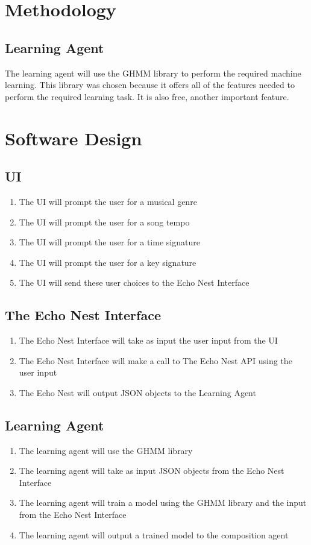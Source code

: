 \documentclass{article}
\begin{document}
\section{Methodology}
\subsection{Learning Agent}
The learning agent will use the GHMM library \cite{GHMM} to perform the required machine learning.
This library was chosen because it offers all of the features needed to perform the required 
learning task. It is also free, another important feature.

\section{Software Design}
\subsection{UI}
\begin{enumerate}
\item The UI will prompt the user for a musical genre
\item The UI will prompt the user for a song tempo
\item The UI will prompt the user for a time signature
\item The UI will prompt the user for a key signature
\item The UI will send these user choices to the Echo Nest Interface
\end{enumerate}

\subsection{The Echo Nest Interface}
\begin{enumerate}
\item The Echo Nest Interface will take as input the user input from the UI
\item The Echo Nest Interface will make a call to The Echo Nest API using the user input
\item The Echo Nest will output JSON objects to the Learning Agent
\end{enumerate}

\subsection{Learning Agent}
\begin{enumerate}
\item The learning agent will use the GHMM library
\item The learning agent will take as input JSON objects from the Echo Nest Interface
\item The learning agent will train a model \cite{GHMM} using the GHMM library and the input from the Echo Nest Interface
\item The learning agent will output a trained model to the composition agent
\end{enumerate}
\end{document}

